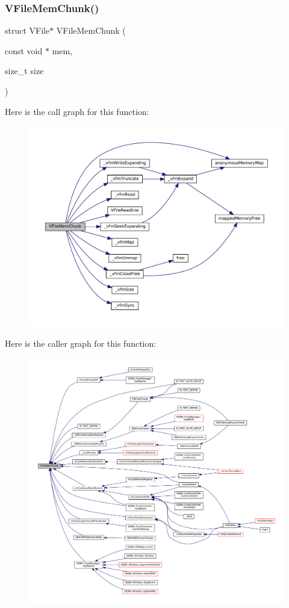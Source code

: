 \subsubsection{\texorpdfstring{V\+File\+Mem\+Chunk()}{VFileMemChunk()}}
{\footnotesize\ttfamily struct V\+File$\ast$ V\+File\+Mem\+Chunk (\begin{DoxyParamCaption}\item[{const void $\ast$}]{mem,  }\item[{size\+\_\+t}]{size }\end{DoxyParamCaption})}

Here is the call graph for this function\+:
\nopagebreak
\begin{figure}[H]
\begin{center}
\leavevmode
\includegraphics[width=350pt]{vfs-mem_8c_a986543bf6b5fd33614d77d3127cefa2a_cgraph}
\end{center}
\end{figure}
Here is the caller graph for this function\+:
\nopagebreak
\begin{figure}[H]
\begin{center}
\leavevmode
\includegraphics[width=350pt]{vfs-mem_8c_a986543bf6b5fd33614d77d3127cefa2a_icgraph}
\end{center}
\end{figure}
